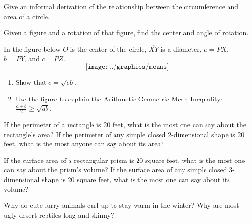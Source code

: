 %
%
\begin{prob}
Give an informal derivation of the relationship between the circumference and area of a circle. 
\end{prob}

\begin{prob}
Given a figure and a rotation of that figure, find the center and angle of rotation.  
\end{prob}

\begin{prob}
In the figure below  $O$ is the center of the circle, $\overline{XY}$ is a diameter, $a = PX$, $b=PY$, and $c=PZ$.  
$$\texttt{[image: ../graphics/means]}$$
\begin{enumerate}
\item Show that $c=\sqrt{ab}$.  
\item Use the figure to explain the Arithmetic-Geometric Mean Inequality: $\frac{a+b}{2} \ge \sqrt{ab}$.  
\end{enumerate}
\end{prob}


\begin{prob}
If the perimeter of a rectangle is 20 feet, what is the most one can say about the rectangle's area?  If the perimeter of any simple closed 2-dimensional shape is 20 feet, what is the most anyone can say about its area?
\end{prob}

\begin{prob}
If the surface area of a rectangular prism is 20 square feet, what is the most one can say about the prism's volume?  If the surface area of any simple closed 3-dimensional shape is 20 square feet, what is the most one can say about its volume? 
\end{prob}

\begin{prob}
Why do cute furry animals curl up to stay warm in the winter?  Why are most ugly desert reptiles long and skinny?
\end{prob}

